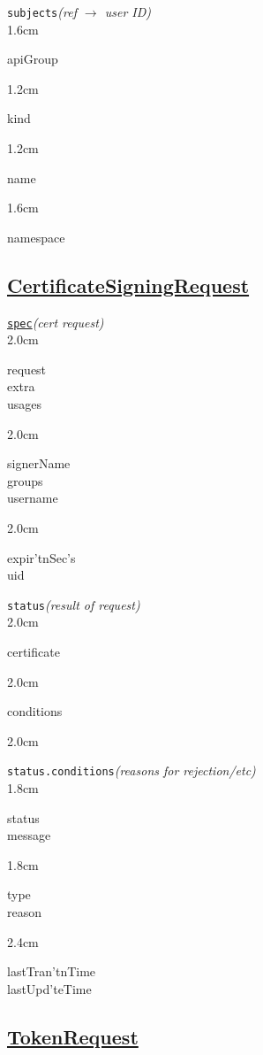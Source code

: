 \texttt{subjects}\quad\textit{(ref $\to$ user ID)}\\[-2mm]
\api
{1.6cm}{
apiGroup        

}
{1.2cm}{
kind

}
{1.2cm}{
name

}
{1.6cm}{
namespace

}
\stopapi



\subsection*{\href{https://kubernetes.io/docs/reference/access-authn-authz/certificate-signing-requests/}{CertificateSigningRequest}}


\texttt{\href{https://kubernetes.io/docs/reference/kubernetes-api/authentication-resources/certificate-signing-request-v1/}{spec}}\quad\textit{(cert request)}\\[-2mm]
\api
{2.0cm}{
request     \\
extra       \\
usages

}
{2.0cm}{
signerName  \\
groups      \\
username


}
{2.0cm}{
expir'tnSec's   \\
uid

}
\stopapi


\texttt{status}\quad\textit{(result of request)}\\[-2mm]
\api
{2.0cm}{
certificate

}
{2.0cm}{
conditions

}
{2.0cm}{

}
\stopapi

\texttt{status.conditions}\quad\textit{(reasons for rejection/etc)}\\[-2mm]
\api
{1.8cm}{
status      \\
message

}
{1.8cm}{
type        \\
reason

}
{2.4cm}{
lastTran'tnTime \\
lastUpd'teTime

}
\stopapi


\subsection*{\href{https://kubernetes.io/docs/reference/access-authn-authz/authentication/\#service-account-tokens}{TokenRequest}}


